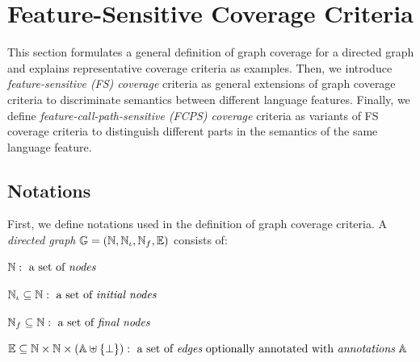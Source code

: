 \section{Feature-Sensitive Coverage Criteria}\label{sec:fscov}

This section formulates a general definition of graph coverage
for a directed graph and explains representative coverage criteria as examples.
Then, we introduce \textit{feature-sensitive (FS) coverage} criteria as general
extensions of graph coverage criteria to discriminate semantics between
different language features.
Finally, we define \textit{feature-call-path-sensitive (FCPS) coverage}
criteria as variants of FS coverage criteria to distinguish different parts in
the semantics of the same language feature.




\subsection{Notations}\label{sec:notation}
%
First, we define notations used in the definition of graph coverage criteria.
%
A \textit{directed graph} $\mathbb{G} = (\mathbb{N}, \mathbb{N}_\iota,
\mathbb{N}_f, \mathbb{E})$ consists of:

\begin{itemize*}
  \item $\mathbb{N}: \text{ a set of {\it nodes}}$ \quad \;
  \item $\mathbb{N}_\iota \subseteq \mathbb{N}: \text{ a set of {\it initial nodes}}$ \quad \;
  \item $\mathbb{N}_f \subseteq \mathbb{N}: \text{ a set of {\it final nodes}}$
\end{itemize*}

\begin{itemize*}
  \item $\mathbb{E} \subseteq \mathbb{N} \times \mathbb{N} \times (\mathbb{A} \uplus \{
    \bot \}): \text{ a set of {\it edges} optionally annotated with {\it
    annotations} } \mathbb{A}$
\end{itemize*}

